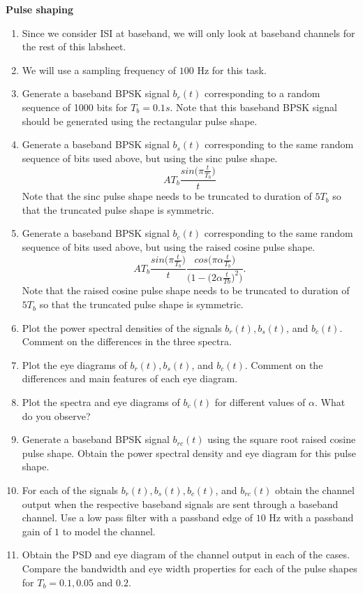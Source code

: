 \myhrule
\noindent
\textbf{Pulse shaping}
\begin{enumerate}
\item Since we consider ISI at baseband, we will only look at baseband channels for the rest of this labsheet.
\item We will use a sampling frequency of $100$ Hz for this task.
\item Generate a baseband BPSK signal $b_{r}(t)$ corresponding to a random sequence of 1000 bits for $T_{b} = 0.1s$. Note that this baseband BPSK signal should be generated using the rectangular pulse shape.
\item Generate a baseband BPSK signal $b_{s}(t)$ corresponding to the same random sequence of bits used above, but using the sinc pulse shape. 
  \[AT_{b} \frac{sin\big(\pi \frac{t}{T_{b}}\big)}{t}\]
Note that the sinc pulse shape needs to be truncated to duration of $5T_{b}$ so that the truncated pulse shape is symmetric.

\item Generate a baseband BPSK signal $b_{c}(t)$ corresponding to the same random sequence of bits used above, but using the raised cosine pulse shape. 
  \[ AT_{b} \frac{sin\big(\pi \frac{t}{T_{b}}\big)}{t} \frac{cos\big(\pi \alpha \frac{t}{T_{b}}\big)}{\big(1 - \big(2\alpha \frac{t}{Tb}\big)^{2}\big)}.\]
Note that the raised cosine pulse shape needs to be truncated to duration of $5T_{b}$ so that the truncated pulse shape is symmetric.

\item Plot the power spectral densities of the signals $b_{r}(t), b_{s}(t)$, and $b_{c}(t)$. Comment on the differences in the three spectra.
\item Plot the eye diagrams of $b_{r}(t), b_{s}(t)$, and $b_{c}(t)$. Comment on the differences and main features of each eye diagram.
\item Plot the spectra and eye diagrams of $b_{c}(t)$ for different values of $\alpha$. What do you observe?

\item Generate a baseband BPSK signal $b_{rc}(t)$ using the square root raised cosine pulse shape. Obtain the power spectral density and eye diagram for this pulse shape.

\item For each of the signals $b_{r}(t), b_{s}(t), b_{c}(t)$, and $b_{rc}(t)$ obtain the channel output when the respective baseband signals are sent through a baseband channel. Use a low pass filter with a passband edge of $10$ Hz with a passband gain of $1$ to model the channel.

\item Obtain the PSD and eye diagram of the channel output in each of the cases. Compare the bandwidth and eye width properties for each of the pulse shapes for $T_{b} = 0.1, 0.05$ and $0.2$.

\end{enumerate}
